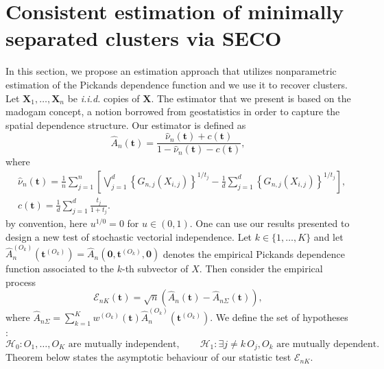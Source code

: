 \documentclass[11pt]{article}
\begin{document}
	\section{Consistent estimation of minimally separated clusters via SECO}
	\label{sec:estimation}
	In this section, we propose an estimation approach that utilizes nonparametric estimation of the Pickands dependence function and we use it to recover clusters.
	Let $\textbf{X}_1, \dots, \textbf{X}_n$ be \emph{i.i.d.} copies of $\textbf{X}$. The estimator that we present is based on the madogam concept, a notion borrowed from geostatistics in order to capture the spatial dependence structure. Our estimator is defined as 
	\begin{equation}
		\hat{A}_n(\textbf{t}) = \frac{\hat{\nu}_n(\textbf{t}) + c(\textbf{t})}{1-\hat{\nu}_n(\textbf{t})-c(\textbf{t})},
	\end{equation}
	where
	\begin{align*}
		& \hat{\nu}_n(\textbf{t}) = \frac{1}{n} \sum_{j=1}^n \left[\bigvee_{j=1}^d \left\{ G_{n,j} (X_{i,j}) \right\}^{1/t_j} - \frac{1}{d} \sum_{j=1}^d \left\{ G_{n,j}(X_{i,j}) \right\}^{1/t_j} \right], \\
		& c(\textbf{t}) = \frac{1}{d} \sum_{j=1}^d \frac{t_j}{1+t_j}.
	\end{align*}
	by convention, here $u^{1/0} = 0$ for $u \in (0,1)$. One can use our results presented to design a new test of stochastic vectorial independence. Let $k\in\{1,\dots,K\}$ and let $\hat{A}_{n}^{(O_k)}(\textbf{t}^{(O_k)}) = \hat{A}_n(\textbf{0},\textbf{t}^{(O_k)}, \textbf{0})$ denotes the empirical Pickands dependence function associated to the $k$-th subvector of $X$. Then consider the empirical process
	\begin{equation}
		\mathcal{E}_{nK} (\textbf{t}) = \sqrt{n}\left(\hat{A}_n(\textbf{t}) - \hat{A}_{n\Sigma}(\textbf{t}) \right),
	\end{equation}
	where $\hat{A}_{n\Sigma} = \sum_{k=1}^K w^{(O_k)}(\textbf{t}) \hat{A}_{n}^{(O_k)}(\textbf{t}^{(O_k)})$. We define the set of hypotheses :
	\begin{equation*}
		\mathcal{H}_0 : O_1, \dots, O_K \textrm{ are mutually independent}, \quad \quad \mathcal{H}_1 : \exists j \neq k \, O_j, O_k \textrm{ are mutually dependent}.
	\end{equation*}
	Theorem below states the asymptotic behaviour of our statistic test $\mathcal{E}_{nK}$.
\end{document}
